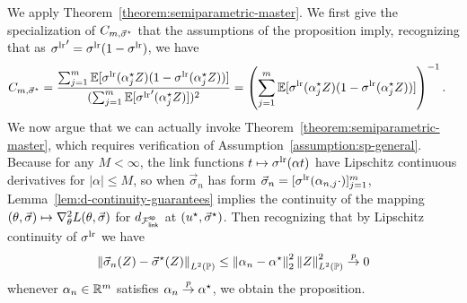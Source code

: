 We apply Theorem~\ref{theorem:semiparametric-master}.
We first give the specialization
of $C_{m,\vec{\sigma}^\star}$ that the assumptions of the proposition
imply, recognizing that as
${\sigma^{\textup{lr}}}' = \sigma^{\textup{lr}}(1 - \sigma^{\textup{lr}})$, we have
\begin{align*}
  C_{m, \vec{\sigma}^\star} & =
  \frac{\sum_{j = 1}^m
    \mathbb{E}[\sigma^{\textup{lr}}(\alpha_j^\star Z) (1 - \sigma^{\textup{lr}}(\alpha_j^\star Z))]}{
    (\sum_{j = 1}^m\mathbb{E}[{\sigma^{\textup{lr}}}'(\alpha_j^\star Z)])^2}
  = \left({ \sum_{j = 1}^m \mathbb{E}[\sigma^{\textup{lr}}(\alpha_j^\star Z) (1 - \sigma^{\textup{lr}}(\alpha_j^\star Z))]}\right)^{-1}.
\end{align*} 
We now argue that we can actually invoke
Theorem~\ref{theorem:semiparametric-master}, which requires verification of
Assumption~\ref{assumption:sp-general}. Because for any $M < \infty$, the
link functions $t \mapsto \sigma^{\textup{lr}}(\alpha t)$ have Lipschitz continuous
derivatives for $|\alpha| \le M$, so when $\vec{\sigma}_n$ has form
$\vec{\sigma}_n = [\sigma^{\textup{lr}}(\alpha_{n,j}\cdot)]_{j = 1}^m$,
Lemma~\ref{lem:d-continuity-guarantees} implies the continuity of the
mapping $(\theta, \vec{\sigma}) \mapsto \nabla_\theta^2 L(\theta,
\vec{\sigma})$ for $d_{\mathcal{F}_{\mathsf{link}}^{\mathsf{sp}}}$ at $(u^\star, \vec{\sigma}^\star)$.
Then recognizing that by
Lipschitz continuity of $\sigma^{\textup{lr}}$ we have
\begin{equation*}
  \left\|{\vec{\sigma}_n(Z)
    - \vec{\sigma}^\star(Z)}\right\|_{L^2(\mathbb{P})}
  \le \left\|{\alpha_n - \alpha^\star}\right\|_2^2 \left\|{Z}\right\|_{L^2(\mathbb{P})}^2
  \stackrel{p}{\rightarrow} 0
\end{equation*}
whenever $\alpha_n \in \mathbb{R}^m$ satisfies $\alpha_n \stackrel{p}{\rightarrow} \alpha^\star$, we
obtain the proposition.
